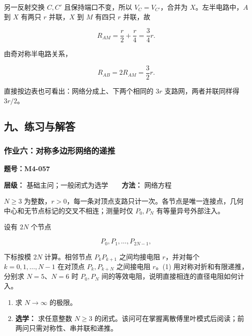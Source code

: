 另一反射交换 \(C,C'\) 且保持端口不变，所以 \(V_C=V_{C'}\)，合并为
\(X\)。左半电路中，\(A\) 到 \(X\) 有两只 \(r\) 并联，\(X\) 到 \(M\)
有四只 \(r\) 并联，故

\[
R_{AM}=\frac r2+\frac r4=\frac34r.
\]

由奇对称半电路关系，

\[
\boxed{R_{AB}=2R_{AM}=\frac32r}.
\]

直接按边表也可看出：网络分成上、下两个相同的 \(3r\)
支路网，两者并联同样得 \(3r/2\)。

\subsection{九、练习与解答}\label{m4:ux4e5dux7ec3ux4e60ux4e0eux89e3ux7b54-2}

\par{}
\noindent\begin{minipage}{\linewidth}

\subsubsection{作业六：对称多边形网络的递推}\label{m4:ux4f5cux4e1aux516dux5bf9ux79f0ux591aux8fb9ux5f62ux7f51ux7edcux7684ux9012ux63a8}

\textbf{题号：M4-057}

\textbf{层级：} 基础主问；一般闭式为选学　　\textbf{方法：} 网络方程

\(N\ge3\)
为整数，\(r>0\)，每一条对顶点支路只计一次。各节点是唯一连接点，几何中心和无节点标记的交叉不相连；测量时仅
\(P_0,P_N\) 有等量异号外部注入。

设有 \(2N\) 个节点

\[
P_0,P_1,\ldots,P_{2N-1},
\]

下标按模 \(2N\) 计算。相邻节点 \(P_kP_{k+1}\) 之间均接电阻
\(r\)，并对每个 \(k=0,1,\ldots,N-1\) 在对顶点 \(P_k,P_{k+N}\) 之间接电阻
\(r\)。(1) 用对称对折和有限递推，分别求 \(N=5\)、\(N=6\) 时 \(P_0,P_N\)
间的等效电阻，说明直接相连的直径电阻如何计入。

\begin{enumerate}
\def\labelenumi{(\arabic{enumi})}
\setcounter{enumi}{1}
\item
  求 \(N\to\infty\) 的极限。
\item
  \textbf{选学：} 求任意整数 \(N\ge3\)
  的闭式。该问可在掌握离散傅里叶模式后阅读；前两问只需对称性、串并联和递推。
\end{enumerate}

\end{minipage}\par

